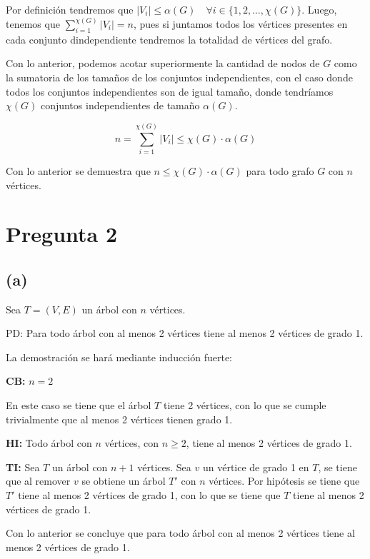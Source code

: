 \documentclass[12pt]{article}
\begin{document}
Por definición tendremos que $|V_i| \leq \alpha(G) \quad \forall i \in \{1, 2, \ldots, \chi(G)\}$.
Luego, tenemos que $\sum_{i=1}^{\chi(G)} |V_i| = n$, pues si juntamos todos los vértices presentes en cada conjunto dindependiente
tendremos la totalidad de vértices del grafo.

Con lo anterior, podemos acotar superiormente la cantidad de nodos de $G$ como la sumatoria de los tamaños de los conjuntos independientes,
con el caso donde todos los conjuntos independientes son de igual tamaño, donde tendríamos $\chi(G)$ conjuntos independientes de tamaño $\alpha(G)$.

\begin{equation*}
    n = \sum_{i=1}^{\chi(G)} |V_i| \leq \chi(G) \cdot \alpha(G)
\end{equation*}

Con lo anterior se demuestra que $n \leq \chi(G) \cdot \alpha(G)$ para todo grafo $G$ con $n$ vértices.

\newpage

\section*{Pregunta 2}

\subsection*{(a)}

Sea $T=(V,E)$ un árbol con $n$ vértices.

PD: Para todo árbol con al menos 2 vértices tiene al menos 2 vértices de grado 1.

La demostración se hará mediante inducción fuerte:

\textbf{CB:} $n=2$

En este caso se tiene que el árbol $T$ tiene 2 vértices, con lo que se cumple trivialmente que al menos 2 vértices tienen grado 1.

\textbf{HI:} Todo árbol con $n$ vértices, con $n \geq 2$, tiene al menos 2 vértices de grado 1.

\textbf{TI:} Sea $T$ un árbol con $n+1$ vértices.
Sea $v$ un vértice de grado 1 en $T$, se tiene que al remover $v$ se obtiene un árbol $T'$ con $n$ vértices.
Por hipótesis se tiene que $T'$ tiene al menos 2 vértices de grado 1, con lo que se tiene que $T$ tiene al menos 2 vértices de grado 1.

Con lo anterior se concluye que para todo árbol con al menos 2 vértices tiene al menos 2 vértices de grado 1.
\end{document}
